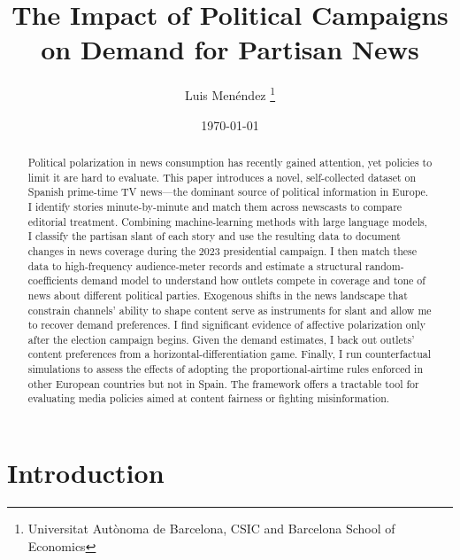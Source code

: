 \documentclass[12pt]{article}
\title{The Impact of Political Campaigns on Demand for Partisan News}
\author{Luis  Menéndez \thanks{Universitat Autònoma de Barcelona, CSIC and Barcelona School of Economics}} %
\date{\today}
\begin{document}
	\maketitle
	
	\begin{abstract}
		

		
		

		
		Political polarization in news consumption has recently gained attention, yet policies to limit it are hard to evaluate. This paper introduces a novel, self-collected dataset on Spanish prime-time TV news—the dominant source of political information in Europe. I identify stories minute-by-minute and match them across newscasts to compare editorial treatment. Combining machine-learning methods with large language models, I classify the partisan slant of each story and use the resulting data to document changes in news coverage during the 2023 presidential campaign. I then match these data to high-frequency audience-meter records and estimate a structural random-coefficients demand model to understand how outlets compete in coverage and tone of news about different political parties. Exogenous shifts in the news landscape that constrain channels’ ability to shape content serve as instruments for slant and allow me to recover demand preferences. I find significant evidence of affective polarization only after the election campaign begins. Given the demand estimates, I back out outlets’ content preferences from a horizontal-differentiation game. Finally, I run counterfactual simulations to assess the effects of adopting the proportional-airtime rules enforced in other European countries but not in Spain. The framework offers a tractable tool for evaluating media policies aimed at content fairness or fighting misinformation.
		
		
		
	\end{abstract}
	
	


	
	
	
	
	
	
	
	\clearpage
	
	
	
	\section{Introduction }
	
	
\end{document}
